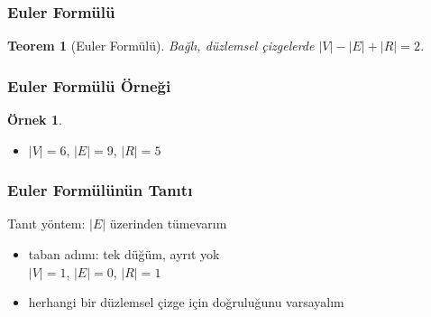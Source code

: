 \documentclass[dvipsnames]{beamer}
\theoremstyle{definition}
\theoremstyle{example}
\newtheorem{ornek}[theorem]{Örnek}
\theoremstyle{plain}
\newtheorem{teorem}[theorem]{Teorem}
\begin{document}
\begin{frame}
  \frametitle{Euler Formülü}

  \begin{teorem}[Euler Formülü]
    Bağlı, düzlemsel çizgelerde $|V| - |E| + |R| = 2$.
  \end{teorem}
\end{frame}

\begin{frame}
  \frametitle{Euler Formülü Örneği}

  \begin{ornek}
    \begin{center}
    \end{center}

    \begin{itemize}
     \item $|V| = 6$, $|E| = 9$, $|R| = 5$
    \end{itemize}
  \end{ornek}
\end{frame}

\begin{frame}
  \frametitle{Euler Formülünün Tanıtı}

  \begin{block}{Tanıt}
    yöntem: $|E|$ üzerinden tümevarım

    \pause
    \begin{itemize}
      \item taban adımı: tek düğüm, ayrıt yok\\
        $|V| = 1$, $|E| = 0$, $|R| = 1$

      \pause
      \item herhangi bir düzlemsel çizge için doğruluğunu varsayalım
    \end{itemize}
  \end{block}
\end{frame}
\end{document}
